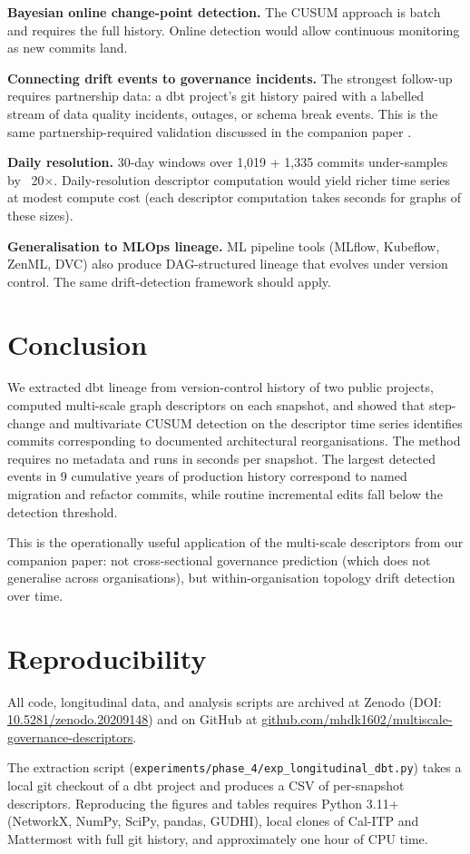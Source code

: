 \documentclass[11pt,a4paper]{article}
\begin{document}
\textbf{Bayesian online change-point detection.} The CUSUM approach is
batch and requires the full history. Online detection
\citep{adams2007bayesian} would allow continuous monitoring as new
commits land.

\textbf{Connecting drift events to governance incidents.} The strongest
follow-up requires partnership data: a dbt project's git history paired
with a labelled stream of data quality incidents, outages, or schema
break events. This is the same partnership-required validation
discussed in the companion paper \citep{hari2026descriptors}.

\textbf{Daily resolution.} 30-day windows over 1,019 + 1,335 commits
under-samples by ~20$\times$. Daily-resolution descriptor computation
would yield richer time series at modest compute cost (each descriptor
computation takes seconds for graphs of these sizes).

\textbf{Generalisation to MLOps lineage.} ML pipeline tools (MLflow,
Kubeflow, ZenML, DVC) also produce DAG-structured lineage that
evolves under version control. The same drift-detection framework
should apply.

\section{Conclusion}

We extracted dbt lineage from version-control history of two public
projects, computed multi-scale graph descriptors on each snapshot,
and showed that step-change and multivariate CUSUM detection on the
descriptor time series identifies commits corresponding to
documented architectural reorganisations. The method requires no
metadata and runs in seconds per snapshot. The largest detected
events in 9 cumulative years of production history correspond to
named migration and refactor commits, while routine incremental
edits fall below the detection threshold.

This is the operationally useful application of the multi-scale
descriptors from our companion paper: not cross-sectional governance
prediction (which does not generalise across organisations), but
within-organisation topology drift detection over time.

\appendix

\section{Reproducibility}

All code, longitudinal data, and analysis scripts are archived at
Zenodo (DOI: \href{https://doi.org/10.5281/zenodo.20209148}{10.5281/zenodo.20209148})
and on GitHub at
\url{github.com/mhdk1602/multiscale-governance-descriptors}.

The extraction script
(\texttt{experiments/phase\_4/exp\_longitudinal\_dbt.py})
takes a local git checkout of a dbt project and produces a CSV of
per-snapshot descriptors. Reproducing the figures and tables requires
Python 3.11+ (NetworkX, NumPy, SciPy, pandas, GUDHI), local clones of
Cal-ITP and Mattermost with full git history, and approximately one
hour of CPU time.



\end{document}
